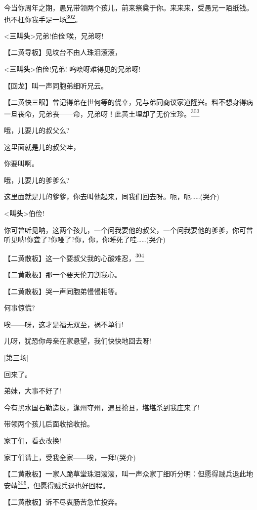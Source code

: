 今当你周年之期，愚兄带领两个孩儿，前来祭奠于你。来来来，受愚兄一陌纸钱。也不枉你我手足一场\protect\hyperlink{fn302}{\textsuperscript{302}}。

\textless{}\textbf{三叫头}\textgreater{}兄弟!伯俭!唉，兄弟呀!

【二黄导板】见坟台不由人珠泪滚滚，

\textless{}\textbf{三叫头}\textgreater{}伯俭!兄弟! 呜哙呀难得见的兄弟呀!

【回龙】叫一声同胞弟细听兄云。

【二黄快三眼】曾记得弟在世何等的侥幸，兄与弟同商议家道隆兴。料不想身得病一旦丧命，兄弟丧------命，兄弟呀！此黄土埋却了无价宝珍。\protect\hyperlink{fn303}{\textsuperscript{303}}

哦，儿要儿的叔父么?

这里面就是儿的叔父哇，

你要叫啊。

哦，儿要儿的爹爹么?

这里面就是儿的爹爹，你去叫他起来，同我们回去呀。呃，呃\ldots{}\ldots{}(哭介)

\textless{}\textbf{叫头}\textgreater{}伯俭!

你可曾听见呐，这两个孩儿，一个问我要他的叔父，一个问我要他的爹爹，你可曾听见呐!你聋了?你哑了?你，你，你睡死了哇\ldots{}\ldots{}(哭介)

【二黄散板】这一个要叔父我的心酸难忍，\protect\hyperlink{fn304}{\textsuperscript{304}}

【二黄散板】那一个要天伦刀割我心。

【二黄散板】哭一声同胞弟慢慢相等。

何事惊慌?

唉------呀，这才是福无双至，祸不单行!

儿呀，犹恐你母亲在家悬望，我们快快地回去呀!

{[}第三场{]}

回来了。

弟妹，大事不好了!

今有黑水国石勒造反，逢州夺州，遇县抢县，堪堪杀到我庄来了!

带领两个孩儿后面收拾收拾。

家丁们，看衣改换!

家丁们请上，受我全家------唉，一拜!(哭介)

【二黄散板】一家人跪草堂珠泪滚滚，叫一声众家丁细听分明：但愿得贼兵退此地安靖\protect\hyperlink{fn305}{\textsuperscript{305}}，但愿得贼兵退也好回程。

【二黄散板】诉不尽衷肠苦急忙投奔。

